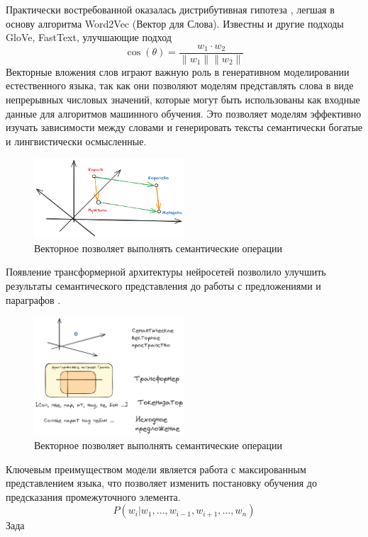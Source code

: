 Практически востребованной оказалась дистрибутивная гипотеза \cite{Schutze},
легшая в основу алгоритма Word2Vec (Вектор для Слова)\cite{NIPS2013_9aa42b31}. 
Известны и другие подходы GloVe, FastText, улучшающие подход
\begin{equation}
    \cos(\theta) = \frac{w_1 \cdot w_2}{\|w_1\| \|w_2\|}
\end{equation}
Векторные вложения слов играют важную роль в генеративном моделировании естественного языка, так как они позволяют моделям представлять слова в виде непрерывных числовых значений, которые могут быть использованы как входные данные для алгоритмов машинного обучения. 
Это позволяет моделям эффективно изучать зависимости между словами и генерировать тексты семантически богатые и лингвистически осмысленные.
\begin{figure}[h]
    \centering
    \includegraphics[width=0.5\textwidth]{assets/ml/nlp/vector.excalidraw.png}
    \caption{Векторное позволяет выполнять семантические операции}
    \label{embedding}
\end{figure}
Появление трансформерной архитектуры нейросетей  позволило улучшить результаты семантического представления до
работы с предложениями и параграфов \cite{devlin2018bert}.
\begin{figure}[h]
    \centering
    \includegraphics[width=0.5\textwidth]{assets/ml/nlp/bert.excalidraw.png}
    \caption{Векторное позволяет выполнять семантические операции}
    \label{nert}
\end{figure}
Ключевым преимуществом модели является работа с максированным представлением языка, что позволяет изменить постановку обучения 
до предсказания промежуточного элемента.
\begin{equation}
    P(w_i |w_1,\dots,w_{i-1},w_{i+1},\dots, w_n) 
\end{equation}
Зада




